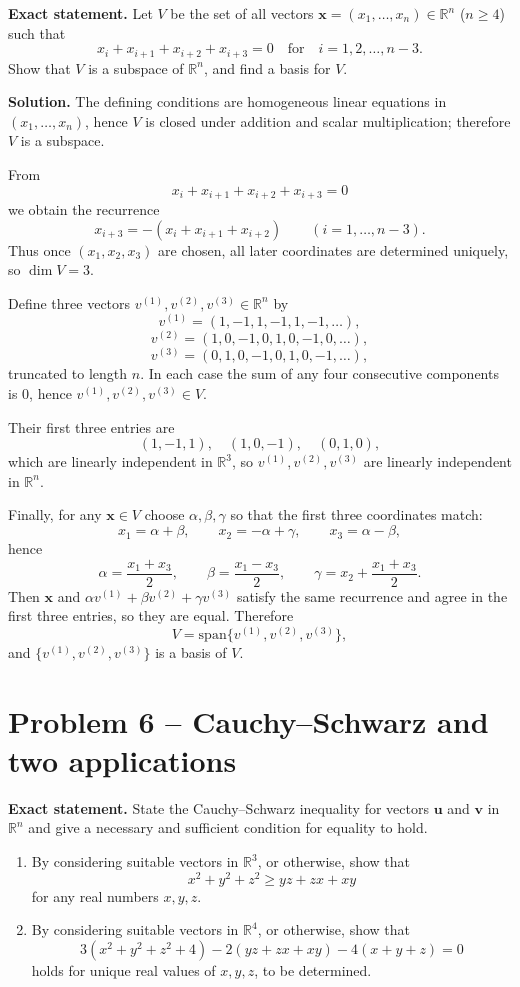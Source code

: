 \documentclass[12pt,a4paper]{article}
\theoremstyle{plain}
\theoremstyle{definition}      %
\begin{document}
\textbf{Exact statement.}
Let $V$ be the set of all vectors $\mathbf{x}=(x_1,\dots,x_n)\in\mathbb{R}^n$ ($n\ge 4$) such that
\[
x_i+x_{i+1}+x_{i+2}+x_{i+3}=0
\quad\text{for}\quad i=1,2,\dots,n-3.
\]
Show that $V$ is a subspace of $\mathbb{R}^n$, and find a basis for $V$.

\textbf{Solution.}
The defining conditions are homogeneous linear equations in $(x_1,\dots,x_n)$, hence $V$ is closed under addition and scalar multiplication; therefore $V$ is a subspace.

From
\[
x_i+x_{i+1}+x_{i+2}+x_{i+3}=0
\]
we obtain the recurrence
\[
x_{i+3}=-(x_i+x_{i+1}+x_{i+2})
\qquad (i=1,\dots,n-3).
\]
Thus once $(x_1,x_2,x_3)$ are chosen, all later coordinates are determined uniquely, so $\dim V=3$.

Define three vectors $v^{(1)},v^{(2)},v^{(3)}\in\mathbb{R}^n$ by
\[
v^{(1)}=(1,-1,1,-1,1,-1,\dots),
\]
\[
v^{(2)}=(1,0,-1,0,1,0,-1,0,\dots),
\]
\[
v^{(3)}=(0,1,0,-1,0,1,0,-1,\dots),
\]
truncated to length $n$. In each case the sum of any four consecutive components is $0$, hence $v^{(1)},v^{(2)},v^{(3)}\in V$.

Their first three entries are
\[
(1,-1,1),\quad (1,0,-1),\quad (0,1,0),
\]
which are linearly independent in $\mathbb{R}^3$, so $v^{(1)},v^{(2)},v^{(3)}$ are linearly independent in $\mathbb{R}^n$.

Finally, for any $\mathbf{x}\in V$ choose $\alpha,\beta,\gamma$ so that the first three coordinates match:
\[
x_1=\alpha+\beta,\qquad x_2=-\alpha+\gamma,\qquad x_3=\alpha-\beta,
\]
hence
\[
\alpha=\frac{x_1+x_3}{2},\qquad
\beta=\frac{x_1-x_3}{2},\qquad
\gamma=x_2+\frac{x_1+x_3}{2}.
\]
Then $\mathbf{x}$ and $\alpha v^{(1)}+\beta v^{(2)}+\gamma v^{(3)}$ satisfy the same recurrence and agree in the first three entries, so they are equal. Therefore
\[
V=\mathrm{span}\{v^{(1)},v^{(2)},v^{(3)}\},
\]
and $\{v^{(1)},v^{(2)},v^{(3)}\}$ is a basis of $V$.

\section*{Problem 6 -- Cauchy--Schwarz and two applications}

\textbf{Exact statement.}
State the Cauchy--Schwarz inequality for vectors $\mathbf u$ and $\mathbf v$ in $\mathbb{R}^n$ and give a necessary and sufficient condition for equality to hold.
\begin{enumerate}[label=(\alph*)]
	\item By considering suitable vectors in $\mathbb{R}^3$, or otherwise, show that
	\[
	x^2+y^2+z^2 \ge yz+zx+xy
	\]
	for any real numbers $x,y,z$.
	\item By considering suitable vectors in $\mathbb{R}^4$, or otherwise, show that
	\[
	3(x^2+y^2+z^2+4)-2(yz+zx+xy)-4(x+y+z)=0
	\]
	holds for unique real values of $x,y,z$, to be determined.
\end{enumerate}
\end{document}
